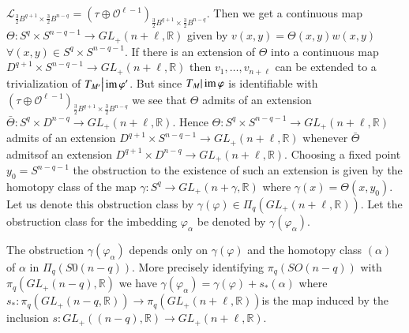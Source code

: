 $\mathscr{L}_{\frac{3}{2} B^{q+1} 
\times \frac{3}{2} B^{n-q}} = (\tau \oplus
 \mathscr{O}^{\ell-1})_{\frac{3}{2} B^{q+1} \times \frac{3}{2}
   B^{n-q}}$. Then we get a  
continuous map $\Theta: S^q \times S^{n-q-1} \to GL_{+} (n+\ell ,
\mathbb{R})$ given by $v (x, y) = \Theta (x, y) w (x, y)$ $\forall (x,
y) \in S^q \times S^{n-q-1}$. If there is an extension of
$\Theta$ into a continuous map $D^{q+1}\times S^{n-q-1}\rightarrow
GL_+ (n+\ell,\mathbb{R})$ then $v_1, \ldots, v_{n+\ell}$ can be extended
to a trivialization of $T_{M'} \big| \operatorname{im} \varphi'$. But since $T_M| \operatorname{im}
\varphi$ is identifiable with $(\tau \oplus
\mathscr{O}^{\ell-1})_{\frac{3}{2}B^{q+1}\times \frac{3}{2}B^{n-q}}$ we see
  that $ \Theta$ 
admits of an extension $\bar{\Theta}: S^q \times D^{n-q}\rightarrow
GL_+ (n+\ell, \mathbb{R})$. Hence $\Theta: S^q \times
S^{n-q-1}\rightarrow GL_+ (n+\ell, \mathbb{R})$ admits of an
extension $D^{q+1}\times S^{n-q-1}\rightarrow GL_+(n+\ell,\mathbb{R})$
whenever $\bar{\Theta}$ 
admits\pageoriginale of an extension $D^{q+1} \times
D^{n-q}\longrightarrow GL_+ 
(n+\ell, \mathbb{R})$. Choosing a fixed point $y_0 = S^{n-q-1}$ the
obstruction to the existence of such an extension is given by the
homotopy class of the map $\gamma: S^q \longrightarrow GL_+ (n+\gamma
, \mathbb{R})$ where $\gamma (x) = \Theta (x, y_0)$. Let us denote
this obstruction class by $\gamma (\varphi)\in \Pi_q (GL_+
(n+ \ell, \mathbb{R}))$. Let the obstruction class for the
imbedding $\varphi_\alpha $ be denoted by $\gamma(\varphi_\alpha)$.  

\setcounter{lemma}{5}
\begin{lemma}\label{chap1:lem3.6}%
The obstruction $\gamma(\varphi_\alpha)$ depends only on $\gamma
(\varphi)$ and the homotopy class $(\alpha)$ of $\alpha$ in $\Pi_q (S
0 (n-q))$. More precisely identifying $\pi_q(SO (n-q))$ with
$\pi_q(GL_+ (n-q), \mathbb{R})$ we have $\gamma (\varphi_\alpha) =
\gamma (\varphi) + s_* (\alpha)$ where $s_*: \pi_q(GL_+ (n-q,
\mathbb{R})) \rightarrow \pi_q (GL_+ (n+\ell, \mathbb{R})) $is the map
induced by the inclusion $s: GL_+ ((n-q) , \mathbb{R}) \rightarrow
GL_+ (n+\ell,\mathbb{R})$.  
\end{lemma}

